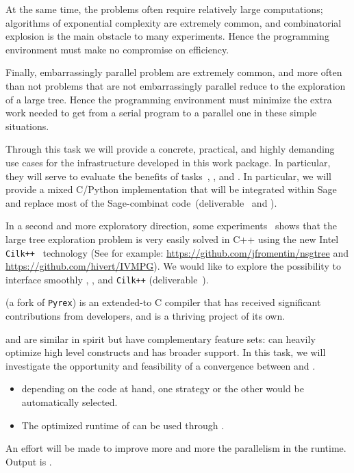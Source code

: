\begin{workpackage}
\begin{tasklist}
\begin{task}[title=HPC infrastructure for combinatorics,id=hpc-combi,PM=26,lead=PS,partners={UB}]
  At the same time, the problems often require relatively large
  computations; algorithms of exponential complexity are extremely
  common, and combinatorial explosion is the main obstacle to many
  experiments. Hence the programming environment must make no
  compromise on efficiency.

  Finally, embarrassingly parallel problem are extremely common, and
  more often than not problems that are not embarrassingly parallel
  reduce to the exploration of a large tree. Hence the programming
  environment must minimize the extra work needed to get from a serial
  program to a parallel one in these simple situations.

  Through this task we will provide a concrete, practical, and highly
  demanding use cases for the infrastructure developed in this work
  package. In particular, they will serve to evaluate the benefits of
  tasks~,
  , and
  .
  In particular, we will provide a mixed C/Python implementation that
  will be integrated within Sage and replace most of the Sage-combinat
  code~(deliverable~ 
  and ).

  In a second and more exploratory direction, some
  experiments~\cite{FromentinHivert} shows that the large tree exploration
  problem is very easily solved in C++ using the new Intel
  \texttt{Cilk++}~\cite{CilkIntel,CilkRefman} technology (See for example:
  \href{https://github.com/jfromentin/nsgtree}{https://github.com/jfromentin/nsgtree}
  and
  \href{https://github.com/hivert/IVMPG}{https://github.com/hivert/IVMPG}). We
  would like to explore the possibility to interface smoothly \Pythran,
  \Cython, and \texttt{Cilk++} (deliverable~).
\end{task}

\begin{task}[title=Pythran,id=pythran,lead=LL,partners={UJF},PM=24, wphases=0-48]
  \Cython (a fork of \texttt{Pyrex}) is an extended-\Python to C
  compiler that has received significant contributions from \Sage
  developers, and is a thriving project of its own.

  \Pythran and \Cython are similar in spirit but have complementary feature
  sets: \Pythran can heavily optimize high level \Numpy constructs and \Cython
  has broader \Python support. In this task, we will investigate the
  opportunity and feasibility of a convergence between \Cython and \Pythran.
  \begin{itemize}
    \item depending on the code at hand, one strategy or the other would be automatically selected.
    \item The optimized runtime of \Pythran can be used through \Cython.
  \end{itemize}
  An effort will be made to improve more and more the parallelism in the
  \Pythran runtime. Output is .


\end{task}
\end{tasklist}
\end{workpackage}
